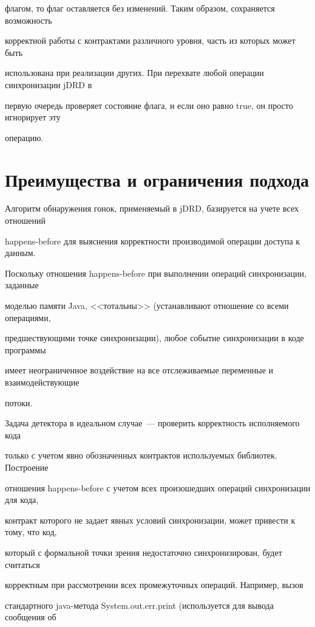 флагом, то флаг оставляется без изменений. Таким образом, сохраняется возможность

корректной работы с контрактами различного уровня, часть из которых может быть

использована при реализации других. При перехвате любой операции синхронизации jDRD в

первую очередь проверяет состояние флага, и если оно равно {\sf true}, он просто игнорирует эту

операцию.



\section{Преимущества и ограничения подхода}



Алгоритм обнаружения гонок, применяемый в jDRD, базируется на учете всех отношений

happens-before для выяснения корректности производимой операции доступа к данным.

Поскольку отношения happens-before при выполнении операций синхронизации, заданные

моделью памяти Java, <<тотальны>> (уста\-нав\-ли\-ва\-ют отношение со всеми операциями,

предшествующими точке синхронизации), любое событие синхронизации в коде программы

имеет неограниченное воздействие на все отслеживаемые переменные и взаимодействующие

потоки.



  Задача детектора в идеальном случае~--- проверить корректность исполняемого кода

только с учетом явно обозначенных контрактов используемых библиотек. Построение

отношения happens-before с учетом всех произошедших операций синхронизации для кода,

контракт которого не задает явных условий синхронизации, может привести к тому, что код,

который с формальной точки зрения недостаточно синхронизирован, будет считаться

корректным при рассмотрении всех промежуточных операций. Например, вызов

стандартного java-ме\-то\-да {\sf System.out.err.print} (используется для вывода сообщения об


